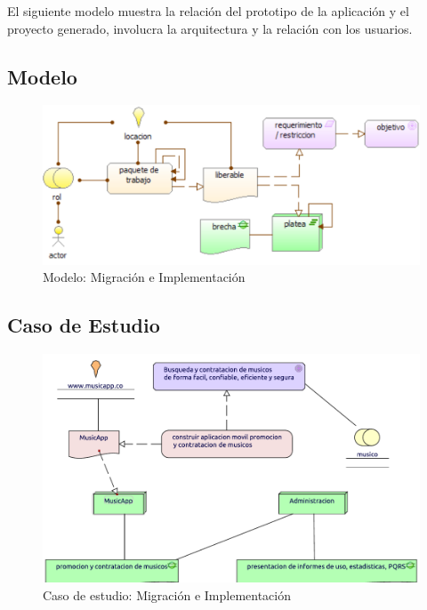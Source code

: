 El siguiente modelo muestra la relación del prototipo de la aplicación y el proyecto generado, involucra la arquitectura y la relación con los usuarios.

\subsection{Modelo}
\begin{figure}[h!]
	\centering
	\includegraphics[width=\linewidth]{Arquitectura/Migracion/imgs/MigracionImplementacionMetamodelo.PNG}
	\caption{Modelo: Migración e Implementación}
\end{figure}
\newpage
\subsection{Caso de Estudio}
\begin{figure}[h!]
	\centering
	\includegraphics[width=\linewidth]{Arquitectura/Migracion/imgs/MigracionImplementacion.pdf}
	\caption{Caso de estudio: Migración e Implementación}
	\label{fig:comportamiento}
\end{figure}

\newpage